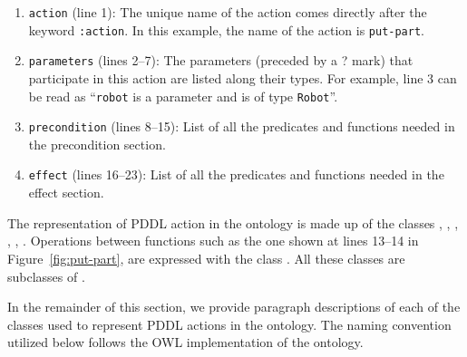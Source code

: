 \begin{enumerate}
  \item \texttt{action} (line 1): The unique name of the action comes directly after the keyword \texttt{:action}. In this example, the name of the action is \texttt{put-part}.
  \item \texttt{parameters} (lines 2--7): The parameters (preceded by a ? mark) that participate in this action are listed along their types. For example, line 3 can be read as ``\texttt{robot} is a parameter and is of type \texttt{Robot}''.
  \item \texttt{precondition} (lines 8--15): List of all the predicates and functions needed in the precondition section.
  \item \texttt{effect} (lines 16--23): List of all the predicates and functions needed in the effect section.
\end{enumerate}

The representation of PDDL action in the ontology is made up of the classes , , , , , .  Operations between functions such as the one shown at lines 13--14 in Figure~\ref{fig:put-part}, are expressed with the class . All these classes are subclasses of .

In the remainder of this section, we provide paragraph descriptions of each of the classes used to represent PDDL actions in the  ontology. The naming convention utilized below follows the OWL implementation of the ontology.

